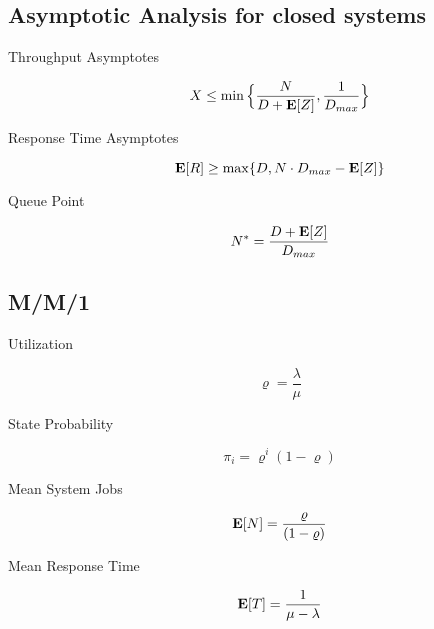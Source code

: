 \subsection{Asymptotic Analysis for closed systems}

\begin{description}
	
	\item [Throughput Asymptotes]	
		\begin{equation}
		X \leq \min \Big\{ \frac{N}{D + \mathbf{E}[Z]} , \frac{1}{D_{max}} \Big\}
		\end{equation}
	
	\item [Response Time Asymptotes]	
		\begin{equation}
		\mathbf{E}[R] \geq \max\{D , N \cdot D_{max} - \mathbf{E}[Z] \}
		\end{equation}
	
	\item [Queue Point]	
		\begin{equation}
		N^{*} = \frac{D + \mathbf{E}[Z]}{D_{max}}
		\end{equation}
	
\end{description}




\subsection{M/M/1}

\begin{description}
	
	\item [Utilization]	
		\begin{equation}
		\varrho = \frac{\lambda}{\mu}
		\end{equation}

	\item [State Probability]	
		\begin{equation}
		\pi_{i} = \varrho^{i}(1-\varrho)
		\end{equation}
	
	\item [Mean System Jobs]	
		\begin{equation}
		\mathbf{E}[N] = \frac{\varrho}{(1-\varrho)}
		\end{equation}
	
	\item [Mean Response Time]	
		\begin{equation}
		\mathbf{E}[T] = \frac{1}{\mu-\lambda}
		\end{equation}	
	
\end{description}




